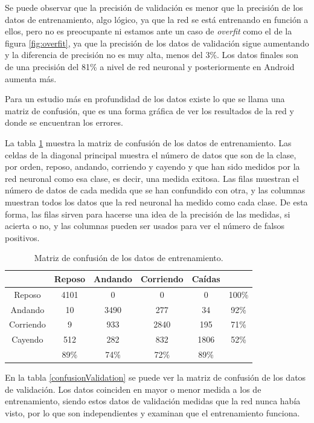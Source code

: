 \documentclass[12pt]{book}
\numberwithin{equation}{section}
\begin{document}
\newpage
Se puede observar que la precisión de validación es menor que la precisión de los datos de entrenamiento, algo lógico, ya que la red se está entrenando en función a ellos, pero no es preocupante ni estamos ante un caso de \textit{overfit} como el de la figura \ref{fig:overfit}, ya que la precisión de los datos de validación sigue aumentando y la diferencia de precisión no es muy alta, menos del 3\%. Los datos finales son de una precisión del 81\% a nivel de red neuronal y posteriormente en Android aumenta más.

Para un estudio más en profundidad de los datos existe lo que se llama una matriz de confusión, que es una forma gráfica de ver los resultados de la red y donde se encuentran los errores.

La tabla \ref{confusionTraining} muestra la matriz de confusión de los datos de entrenamiento. Las celdas de la diagonal principal muestra el número de datos que son de la clase, por orden, reposo, andando, corriendo y cayendo y que han sido medidos por la red neuronal como esa clase, es decir, una medida exitosa. Las filas muestran el número de datos de cada medida que se han confundido con otra, y las columnas muestran todos los datos que la red neuronal ha medido como cada clase. De esta forma, las filas sirven para hacerse una idea de la precisión de las medidas, si acierta o no, y las columnas pueden ser usados para ver el número de falsos positivos.

\begin{table}[h]
\centering
\begin{tabular} {| c || c | c | c | c || c |}
  \hline
   & Reposo & Andando & Corriendo & Caídas & \\
  \hline
  \hline
  Reposo & \cellcolor{green!25}4101 & 0 & 0 & 0 & 100\% \\
  \hline
  Andando & 10 & \cellcolor{green!25}3490 & 277 & 34 & 92\% \\
  \hline
  Corriendo & 9 & 933 & \cellcolor{green!25}2840 & 195 & 71\% \\
  \hline
  Cayendo & 512 & 282 & 832 & \cellcolor{green!25}1806 & 52\% \\
  \hline
  \hline
   & 89\% & 74\% & 72\% & 89\% & \\
  \hline
\end{tabular}
\caption{Matriz de confusión de los datos de entrenamiento.}
\label{confusionTraining}
\end{table}

En la tabla \ref{confusionValidation} se puede ver la matriz de confusión de los datos de validación. Los datos coinciden en mayor o menor medida a los de entrenamiento, siendo estos datos de validación medidas que la red nunca había visto, por lo que son independientes y examinan que el entrenamiento funciona.
\end{document}

